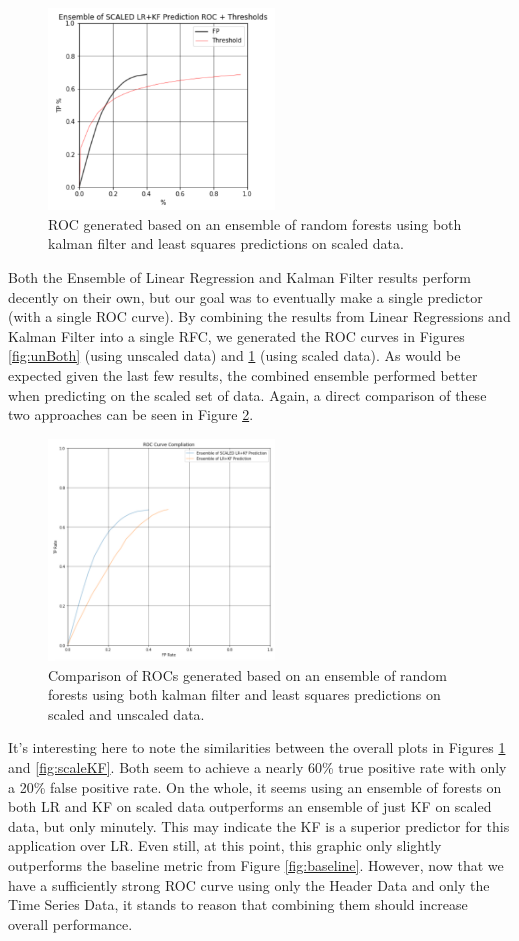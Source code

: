 \begin{figure}[h]
\centering
\includegraphics[width=6cm]{body/results/enLR_KFs.png}
\caption{ROC generated based on an ensemble of random forests using both kalman filter and least squares predictions on scaled data.}
\label{fig:scaleBoth}
\end{figure}

Both the Ensemble of Linear Regression and Kalman Filter results perform decently on their own, but our goal was to eventually make a single predictor (with a single ROC curve). By combining the results from Linear Regressions and Kalman Filter into a single RFC, we generated the ROC curves in Figures \ref{fig:unBoth} (using unscaled data) and \ref{fig:scaleBoth} (using scaled data). As would be expected given the last few results, the combined ensemble performed better when predicting on the scaled set of data. Again, a direct comparison of these two approaches can be seen in Figure \ref{fig:compCombo}.

\begin{figure}[h!]
\centering
\includegraphics[width=6cm]{body/results/ensCombos.png}
\caption{Comparison of ROCs generated based on an ensemble of random forests using both kalman filter and least squares predictions on scaled and unscaled data.}
\label{fig:compCombo}
\end{figure}

 It's interesting here to note the similarities between the overall plots in Figures \ref{fig:scaleBoth} and \ref{fig:scaleKF}. Both seem to achieve a nearly 60\% true positive rate with only a 20\% false positive rate. On the whole, it seems using an ensemble of forests on both LR and KF on scaled data outperforms an ensemble of just KF on scaled data, but only minutely. This may indicate the KF is a superior predictor for this application over LR. Even still, at this point, this graphic only slightly outperforms the baseline metric from Figure \ref{fig:baseline}. However, now that we have a sufficiently strong ROC curve using only the Header Data and only the Time Series Data, it stands to reason that combining them should increase overall performance. 


